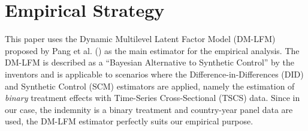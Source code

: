 \documentclass[
  a4paper,
  abstract=true]{scrartcl}
\theoremstyle{definition}
\begin{document}
\begin{table}[h]

\caption{\label{tbl-summary}Summary statistics of the data}


\end{table}%

\section{Empirical Strategy}\label{sec-empirical}

This paper uses the Dynamic Multilevel Latent Factor Model (DM-LFM)
proposed by Pang et al. () as the main
estimator for the empirical analysis. The DM-LFM is described as a
``Bayesian Alternative to Synthetic Control'' by the inventors and is
applicable to scenarios where the Difference-in-Differences (DID) and
Synthetic Control (SCM) estimators are applied, namely the estimation of
\emph{binary} treatment effects with Time-Series Cross-Sectional (TSCS)
data. Since in our case, the indemnity is a binary treatment and
country-year panel data are used, the DM-LFM estimator perfectly suits
our empirical purpose.
\end{document}
